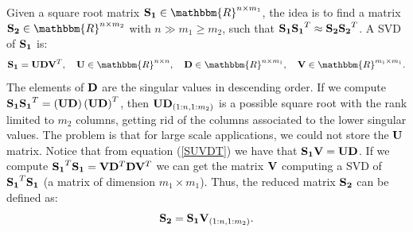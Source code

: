 \documentclass[12pt]{article}
\begin{document}
\begin{itemize}
Given a square root matrix ${\bf S_1} \in \mathbbm{R}^{n \times m_1}$, the idea is to find a matrix ${\bf S_2} \in \mathbbm{R}^{n \times m_2}$ with $n \gg m_1 \geq m_2$, such that ${\bf S_1} {\bf S_1}^T \approx {\bf S_2} {\bf S_2}^T$. A SVD of ${\bf S_1}$ is:
\begin{equation} \label{SUVDT}
{\bf S_1} = {\bf U} {\bf D} {\bf V}^T, \quad {\bf U} \in \mathbbm{R}^{n \times n}, \quad {\bf D} \in \mathbbm{R}^{n \times m_1}, \quad {\bf V} \in \mathbbm{R}^{m_1 \times m_1}.
\end{equation}
The elements of ${\bf D}$ are the singular values in descending order. If we compute ${\bf S_1} {\bf S_1}^T = \left( {\bf U} {\bf D} \right) \left( {\bf U} {\bf D} \right)^T$, then ${\bf U} {\bf D}_{ \left( 1 : n , 1 : m_2 \right) }$ is a possible square root with the rank limited to $m_2$ columns, getting rid of the columns associated to the lower singular values. The problem is that for large scale applications, we could not store the ${\bf U}$ matrix. Notice that from equation (\ref{SUVDT}) we have that ${\bf S_1} {\bf V} = {\bf U} {\bf D}$. If we compute ${\bf S_1}^T {\bf S_1} = {\bf V} {\bf D}^T {\bf D} {\bf V}^T$ we can get the matrix ${\bf V}$ computing a SVD of ${\bf S_1}^T {\bf S_1}$ (a matrix of dimension $m_1 \times m_1$). Thus, the reduced matrix ${\bf S_2}$ can be defined as:
\begin{equation}
{\bf S_2} = {\bf S_1} {\bf V}_{ \left( 1 : n , 1 : m_2 \right) }.
\end{equation}   
\end{itemize} 

\end{document}
